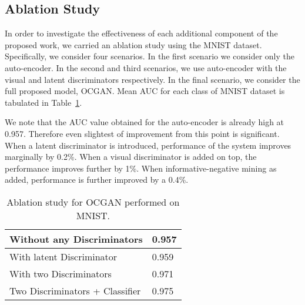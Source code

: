 \documentclass[10pt,twocolumn,letterpaper]{article}
\begin{document}
\subsection{Ablation Study}
In order to investigate the effectiveness of each additional component of the proposed work, we carried an ablation study using the MNIST dataset. Specifically, we consider four scenarios. In the first scenario we consider only the auto-encoder. In the second and third scenarios, we use auto-encoder with the visual and latent discriminators respectively. In the final scenario, we consider the full proposed model, OCGAN. Mean AUC for each class of MNIST dataset is tabulated in Table~\ref{tbl:ablation}. 

We note that the AUC value obtained for the auto-encoder is already high at 0.957. Therefore even slightest of improvement from this point is significant. When a latent discriminator is
introduced, performance of the system improves marginally by 0.2\%. When a visual discriminator is added on top, the performance improves further by 1\%.  When informative-negative mining as added, performance is further improved by a 0.4\%.




\begin{table}[!h]
	\centering
	\caption{Ablation study for OCGAN performed on MNIST. }
	\label{tbl:ablation}
\begin{tabular}{|l|l|}
			\hline
		Without any Discriminators      & 0.957 \\ \hline
With latent Discriminator       & 0.959 \\ \hline
With two Discriminators         & 0.971 \\ \hline
Two Discriminators + Classifier & 0.975 \\ \hline
			
				\end{tabular}
\end{table}
\end{document}
